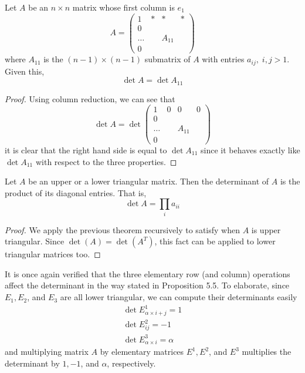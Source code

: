  \begin{theorem}
  Let $A$ be an $n \times n$ matrix whose first column is $e_1$
  \[A = \begin{pmatrix}
  1&*&*&* \\
  0 &&& \\
  \ldots& & A_{11}& \\
  0&&&
  \end{pmatrix}\]
  where $A_{11}$ is the $(n-1) \times (n-1)$ submatrix of $A$ with entries $a_{i j}, \; i, j > 1$. Given this, 
  \[\det{A} = \det{A_{11}}\]
  \end{theorem}
  \begin{proof}
  Using column reduction, we can see that 
  \[ \det{A} = \det{\begin{pmatrix}
  1&0&0&0 \\
  0 &&& \\
  \ldots& & A_{11}& \\
  0&&&
  \end{pmatrix}}\]
  it is clear that the right hand side is equal to $\det{A_{11}}$ since it behaves exactly like $\det{A_{11}}$ with respect to the three properties. 
  \end{proof}

  \begin{corollary}
  Let $A$ be an upper or a lower triangular matrix. Then the determinant of $A$ is the product of its diagonal entries. That is,  
  \[ \det{A} = \prod_{i} a_{i i}\]
  \end{corollary}
  \begin{proof}
  We apply the previous theorem recursively to satisfy when $A$ is upper triangular. Since $\det{(A)} = \det{(A^T)}$, this fact can be applied to lower triangular matrices too. 
  \end{proof}

  It is once again verified that the three elementary row (and column) operations affect the determinant in the way stated in Proposition 5.5. To elaborate, since $E_1, E_2$, and $E_3$ are all lower triangular, we can compute their determinants easily
  \begin{align*}
      \det{E^1_{\alpha \times i + j}} = 1 \\
      \det{E^2_{i j}} = -1 \\
      \det{E^3_{\alpha \times i}} = \alpha
  \end{align*}
  and multiplying matrix $A$ by elementary matrices $E^1, E^2$, and $E^3$ multiplies the determinant by $1, -1$, and $\alpha$, respectively. 

